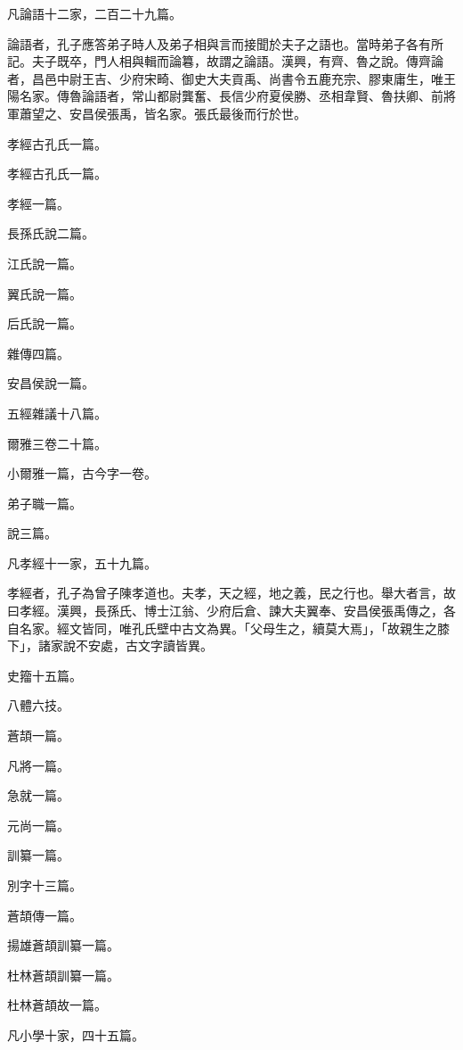 \begin{pinyinscope}
凡論語十二家，二百二十九篇。

論語者，孔子應答弟子時人及弟子相與言而接聞於夫子之語也。當時弟子各有所記。夫子既卒，門人相與輯而論篹，故謂之論語。漢興，有齊、魯之說。傳齊論者，昌邑中尉王吉、少府宋畸、御史大夫貢禹、尚書令五鹿充宗、膠東庸生，唯王陽名家。傳魯論語者，常山都尉龔奮、長信少府夏侯勝、丞相韋賢、魯扶卿、前將軍蕭望之、安昌侯張禹，皆名家。張氏最後而行於世。

孝經古孔氏一篇。

孝經古孔氏一篇。

孝經一篇。

長孫氏說二篇。

江氏說一篇。

翼氏說一篇。

后氏說一篇。

雜傳四篇。

安昌侯說一篇。

五經雜議十八篇。

爾雅三卷二十篇。

小爾雅一篇，古今字一卷。

弟子職一篇。

說三篇。

凡孝經十一家，五十九篇。

孝經者，孔子為曾子陳孝道也。夫孝，天之經，地之義，民之行也。舉大者言，故曰孝經。漢興，長孫氏、博士江翁、少府后倉、諫大夫翼奉、安昌侯張禹傳之，各自名家。經文皆同，唯孔氏壁中古文為異。「父母生之，續莫大焉」，「故親生之膝下」，諸家說不安處，古文字讀皆異。

史籀十五篇。

八體六技。

蒼頡一篇。

凡將一篇。

急就一篇。

元尚一篇。

訓纂一篇。

別字十三篇。

蒼頡傳一篇。

揚雄蒼頡訓纂一篇。

杜林蒼頡訓纂一篇。

杜林蒼頡故一篇。

凡小學十家，四十五篇。


\end{pinyinscope}

